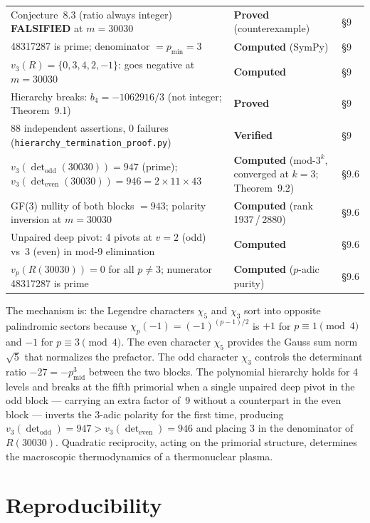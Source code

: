 \documentclass[11pt,letterpaper]{article}
\theoremstyle{definition}
\begin{document}
\begin{longtable}{@{}p{}p{}l@{}}
Conjecture~8.3 (ratio always integer) \textbf{FALSIFIED} at $m = 30030$ & \textbf{Proved} (counterexample) & \S9 \\
48317287 is prime; denominator $= p_{\text{min}} = 3$ & \textbf{Computed} (SymPy) & \S9 \\
$v_3(R) = \{0, 3, 4, 2, -1\}$: goes negative at $m = 30030$ & \textbf{Computed} & \S9 \\
Hierarchy breaks: $b_4 = -1062916/3$ (not integer; Theorem~9.1) & \textbf{Proved} & \S9 \\
88 independent assertions, 0 failures (\texttt{hierarchy\_termination\_proof.py}) & \textbf{Verified} & \S9 \\
$v_3(\det_{\text{odd}}(30030)) = 947$ (prime); $v_3(\det_{\text{even}}(30030)) = 946 = 2 \times 11 \times 43$ & \textbf{Computed} (mod-$3^k$, converged at $k{=}3$; Theorem~9.2) & \S9.6 \\
GF(3) nullity of both blocks $= 943$; polarity inversion at $m = 30030$ & \textbf{Computed} (rank 1937\,/\,2880) & \S9.6 \\
Unpaired deep pivot: 4 pivots at $v{=}2$ (odd) vs~3 (even) in mod-9 elimination & \textbf{Computed} & \S9.6 \\
$v_p(R(30030)) = 0$ for all $p \neq 3$; numerator 48317287 is prime & \textbf{Computed} ($p$-adic purity) & \S9.6 \\
\bottomrule
\end{longtable}

The mechanism is: the Legendre characters $\chi_5$ and $\chi_3$ sort into opposite palindromic sectors because $\chi_p(-1) = (-1)^{(p-1)/2}$ is $+1$ for $p \equiv 1 \pmod{4}$ and $-1$ for $p \equiv 3 \pmod{4}$. The even character $\chi_5$ provides the Gauss sum norm $\sqrt{5}$ that normalizes the prefactor. The odd character $\chi_3$ controls the determinant ratio $-27 = -p_{\text{mid}}^3$ between the two blocks. The polynomial hierarchy holds for 4 levels and breaks at the fifth primorial when a single unpaired deep pivot in the odd block --- carrying an extra factor of~9 without a counterpart in the even block --- inverts the 3-adic polarity for the first time, producing $v_3(\det_{\text{odd}}) = 947 > v_3(\det_{\text{even}}) = 946$ and placing 3 in the denominator of $R(30030)$. Quadratic reciprocity, acting on the primorial structure, determines the macroscopic thermodynamics of a thermonuclear plasma.


\section{Reproducibility}
\end{document}
